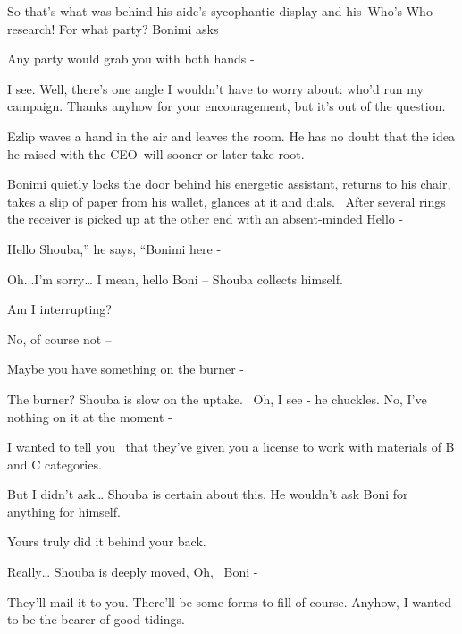 \documentclass[letterpaper]{article}
\begin{document}
So that's what was behind his aide's sycophantic display{ }and his~{\textquotedbl}Who's
Who{\textquotedbl} research! {\textquotedbl}For what party?{\textquotedbl} Bonimi asks

{\textquotedbl}Any party would grab you with both hands - {\textquotedbl} 

{\textquotedbl}I see. Well, there's one angle{ }I wouldn't have to worry about: who'd run my campaign.
Thanks anyhow for your encouragement, but it's out of the question.{\textquotedbl}

Ezlip waves a hand in the air and leaves the room. He has no doubt that the idea he raised with the CEO~will sooner or
later take root{. }

Bonimi quietly locks the door behind his energetic assistant, returns to his chair, takes a slip of paper from his
wallet, glances at it and dials.~ After several rings the receiver is picked up at the other end with an absent-minded
{\textquotedbl}Hello -{\textquotedbl}

{\textquotedbl}Hello Shouba,'' he says, ``Bonimi here -{\textquotedbl} 

{\textquotedbl}Oh...I'm sorry{\dots} I mean, hello Boni --{\textquotedbl} Shouba collects himself.

{\textquotedbl}Am I interrupting?{\textquotedbl} 

{\textquotedbl}No, of course not --{\textquotedbl} 

{\textquotedbl}Maybe you have something on the burner -{\textquotedbl} 

{\textquotedbl}The burner?{\textquotedbl} Shouba is slow on the uptake. ~{\textquotedbl}Oh, I see -{\textquotedbl} he
chuckles. {\textquotedbl}No, I've nothing on it at the moment -{\textquotedbl} 

{\textquotedbl}I wanted to tell you \ that they've given you a license to work with materials of B and C
categories.{\textquotedbl} 

{\textquotedbl}But I didn't ask{\dots}{\textquotedbl} Shouba is certain about this. He wouldn't ask Boni for anything
for himself. 

{\textquotedbl}Yours truly did it behind your back.{\textquotedbl} 

{\textquotedbl}Really{\dots}{\textquotedbl} Shouba is deeply moved, {\textquotedbl}Oh, ~Boni -{\textquotedbl} 

{\textquotedbl}They'll mail it to you. There'll be some forms to fill of course. Anyhow, I wanted to be the bearer of
good tidings.{\textquotedbl} 
\end{document}

